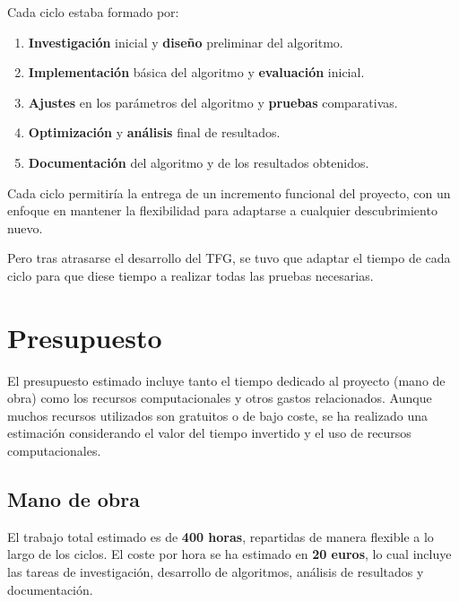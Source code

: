 Cada ciclo estaba formado por:
\begin{enumerate}
    \item \textbf{Investigación} inicial y \textbf{diseño} preliminar del algoritmo.
    \item \textbf{Implementación} básica del algoritmo y \textbf{evaluación} inicial.
    \item \textbf{Ajustes} en los parámetros del algoritmo y \textbf{pruebas} comparativas.
    \item \textbf{Optimización} y \textbf{análisis} final de resultados.
    \item \textbf{Documentación} del algoritmo y de los resultados obtenidos.
\end{enumerate}

Cada ciclo permitiría la entrega de un incremento funcional del proyecto, con un enfoque en mantener la flexibilidad
para adaptarse a cualquier descubrimiento nuevo.

Pero tras atrasarse el desarrollo del TFG, se tuvo que adaptar el tiempo de cada ciclo para que diese tiempo a
realizar todas las pruebas necesarias.

\section{Presupuesto}\label{sec:presupuesto}
El presupuesto estimado incluye tanto el tiempo dedicado al proyecto (mano de obra) como los recursos computacionales y
otros gastos relacionados.
Aunque muchos recursos utilizados son gratuitos o de bajo coste, se ha realizado una estimación considerando el valor
del tiempo invertido y el uso de recursos computacionales.

\subsection{Mano de obra}\label{subsec:mano-de-obra}
El trabajo total estimado es de \textbf{400 horas}, repartidas de manera flexible a lo largo de los ciclos.
El coste por hora se ha estimado en \textbf{20 euros}, lo cual incluye las tareas de investigación, desarrollo de
algoritmos, análisis de resultados y documentación.

